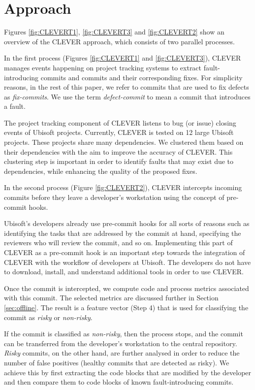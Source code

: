 \documentclass[12pt]{report}
\begin{document}
\section{Approach}\label{approach-3}

Figures \ref{fig:CLEVERT1}, \ref{fig:CLEVERT3} and \ref{fig:CLEVERT2}
show an overview of the CLEVER approach, which consists of two parallel
processes.

In the first process (Figures \ref{fig:CLEVERT1} and
\ref{fig:CLEVERT3}), CLEVER manages events happening on project tracking
systems to extract fault-introducing commits and commits and their
corresponding fixes. For simplicity reasons, in the rest of this paper,
we refer to commits that are used to fix defects as \emph{fix-commits}.
We use the term \emph{defect-commit} to mean a commit that introduces a
fault.

The project tracking component of CLEVER listens to bug (or issue)
closing events of Ubisoft projects. Currently, CLEVER is tested on 12
large Ubisoft projects. These projects share many dependencies. We
clustered them based on their dependencies with the aim to improve the
accuracy of CLEVER. This clustering step is important in order to
identify faults that may exist due to dependencies, while enhancing the
quality of the proposed fixes.



In the second process (Figure \ref{fig:CLEVERT2}), CLEVER intercepts
incoming commits before they leave a developer's workstation using the
concept of pre-commit hooks.

Ubisoft's developers already use pre-commit hooks for all sorts of
reasons such as identifying the tasks that are addressed by the commit
at hand, specifying the reviewers who will review the commit, and so on.
Implementing this part of CLEVER as a pre-commit hook is an important
step towards the integration of CLEVER with the workflow of developers
at Ubisoft. The developers do not have to download, install, and
understand additional tools in order to use CLEVER.

Once the commit is intercepted, we compute code and process metrics
associated with this commit. The selected metrics are discussed further
in Section \ref{sec:offline}. The result is a feature vector (Step 4)
that is used for classifying the commit as \emph{risky} or
\emph{non-risky}.

If the commit is classified as \emph{non-risky}, then the process stops,
and the commit can be transferred from the developer's workstation to
the central repository. \emph{Risky} commits, on the other hand, are
further analysed in order to reduce the number of false positives
(healthy commits that are detected as risky). We achieve this by first
extracting the code blocks that are modified by the developer and then
compare them to code blocks of known fault-introducing commits.
\end{document}
